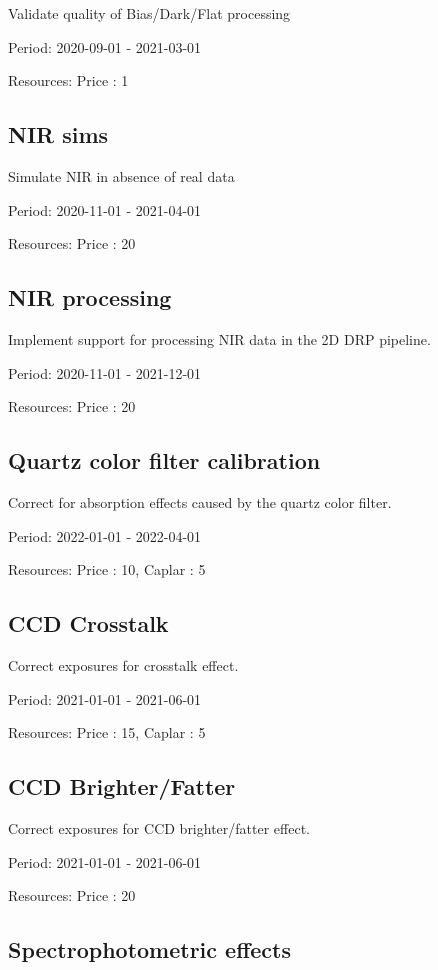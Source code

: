 Validate quality of Bias/Dark/Flat processing

Period: 2020-09-01 - 2021-03-01

Resources: Price : 1

\subsection{NIR sims}

Simulate NIR in absence of real data

Period: 2020-11-01 - 2021-04-01

Resources: Price : 20

\subsection{NIR processing}

Implement support for processing NIR data in the 2D DRP pipeline.

Period: 2020-11-01 - 2021-12-01

Resources: Price : 20

\subsection{Quartz color filter calibration}

Correct for absorption effects caused by the quartz color filter.

Period: 2022-01-01 - 2022-04-01

Resources: Price : 10, Caplar : 5

\subsection{CCD Crosstalk}

Correct exposures for crosstalk effect.

Period: 2021-01-01 - 2021-06-01

Resources: Price : 15, Caplar : 5

\subsection{CCD Brighter/Fatter}

Correct exposures for CCD brighter/fatter effect.

Period: 2021-01-01 - 2021-06-01

Resources: Price : 20

\subsection{Spectrophotometric effects}

